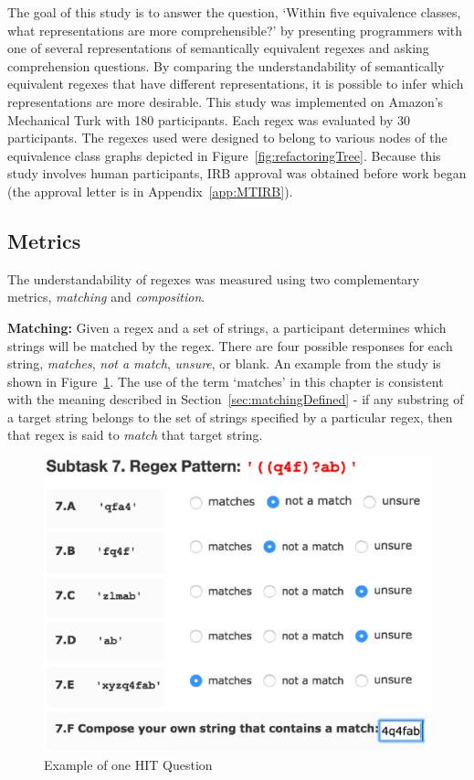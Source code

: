
The goal of this study is to answer the question, `Within five equivalence classes, what representations are more comprehensible?' by presenting programmers with one of several representations of semantically equivalent regexes and asking comprehension questions. By comparing the understandability of semantically equivalent regexes that have different representations, it is possible to infer which representations are more desirable.
This study was implemented on Amazon's Mechanical Turk with 180 participants.  Each regex was evaluated by 30 participants.
The regexes used were designed to belong to various nodes of the equivalence class graphs depicted in Figure~\ref{fig:refactoringTree}.  Because this study involves human participants, IRB approval was obtained before work began (the approval letter is in Appendix~\ref{app:MTIRB}).



\subsection{Metrics}
\label{sec:understandabilityMetrics}
The understandability of regexes was measured using two complementary metrics, \emph{matching} and \emph{composition}.

\textbf{Matching:}
Given a regex and a set of strings, a participant determines which strings will be matched by the regex. There are four possible responses for each string, \emph{matches}, \emph{not a match}, \emph{unsure}, or blank. An example from the study is shown in Figure~\ref{fig:exampleQuestion}.  The use of the term `matches' in this chapter is consistent with the meaning described in Section~\ref{sec:matchingDefined} - if any substring of a target string belongs to the set of strings specified by a particular regex, then that regex is said to \emph{match} that target string.


\begin{figure}[tb]
\centering
\includegraphics[width=0.54\columnwidth]{nontex/illustrations/exampleQuestion.eps}
\vspace{-12pt}
\caption{Example of one HIT Question}
\vspace{-6pt}
\label{fig:exampleQuestion}
\end{figure}

